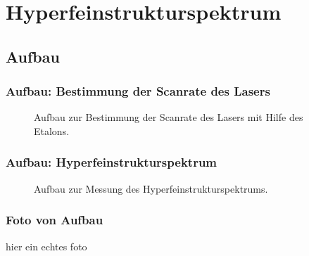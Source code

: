 
\section{Hyperfeinstrukturspektrum}
\subsection{Aufbau}


\begin{frame}
\frametitle{Aufbau: Bestimmung der Scanrate des Lasers}

\begin{figure}
    \centering
    \def\svgwidth{\textwidth}
    
    \caption{Aufbau zur Bestimmung der Scanrate des Lasers mit Hilfe des Etalons.}
\end{figure}

\end{frame}

\begin{frame}
\frametitle{Aufbau: Hyperfeinstrukturspektrum}

\begin{figure}
    \centering
    \def\svgwidth{\textwidth}
    
    \caption{Aufbau zur Messung des Hyperfeinstrukturspektrums.}
\end{figure}

\end{frame}



\begin{frame}
\frametitle{Foto von Aufbau}

hier ein echtes foto

\end{frame}



